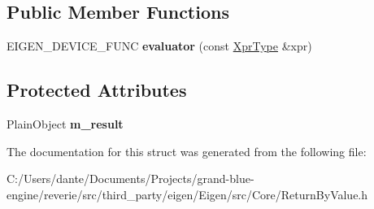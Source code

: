 \subsection*{Public Member Functions}
\begin{DoxyCompactItemize}
\item 
\mbox{\label{struct_eigen_1_1internal_1_1evaluator_3_01_return_by_value_3_01_derived_01_4_01_4_aa2c9c15935bfab4db256de0f0c78679b}} 
E\+I\+G\+E\+N\+\_\+\+D\+E\+V\+I\+C\+E\+\_\+\+F\+U\+NC {\bfseries evaluator} (const \mbox{\hyperlink{class_eigen_1_1_return_by_value}{Xpr\+Type}} \&xpr)
\end{DoxyCompactItemize}
\subsection*{Protected Attributes}
\begin{DoxyCompactItemize}
\item 
\mbox{\label{struct_eigen_1_1internal_1_1evaluator_3_01_return_by_value_3_01_derived_01_4_01_4_abc40dbe3721e9fc75fa633f67d58f1c2}} 
Plain\+Object {\bfseries m\+\_\+result}
\end{DoxyCompactItemize}


The documentation for this struct was generated from the following file\+:\begin{DoxyCompactItemize}
\item 
C\+:/\+Users/dante/\+Documents/\+Projects/grand-\/blue-\/engine/reverie/src/third\+\_\+party/eigen/\+Eigen/src/\+Core/Return\+By\+Value.\+h\end{DoxyCompactItemize}

